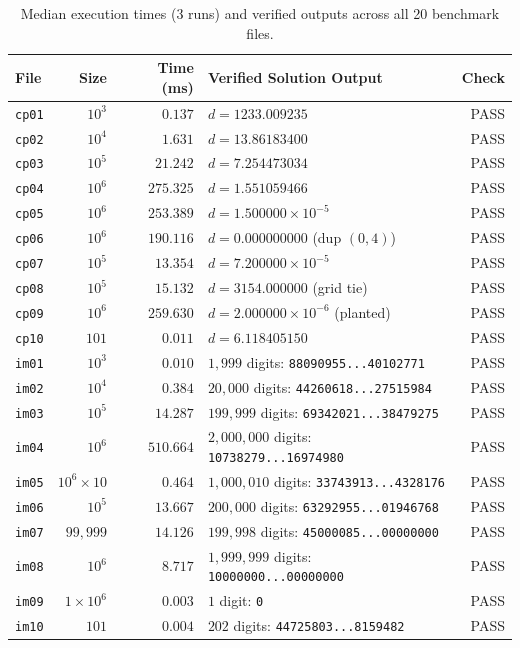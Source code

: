\documentclass[10pt,twocolumn]{article}
\begin{document}
\begin{table}[t]
\centering
\caption{Median execution times ($3$ runs) and verified outputs across all 20 benchmark files.}
\label{tab:results}
\scriptsize
\setlength{\tabcolsep}{2.8pt}
\begin{tabularx}{\columnwidth}{@{}lrrXr@{}}
\toprule
\textbf{File} & \textbf{Size} & \textbf{Time (ms)} & \textbf{Verified Solution Output} & \textbf{Check} \\
\midrule
\texttt{cp01} & $10^3$ & $0.137$ & $d = 1233.009235$ & PASS \\
\texttt{cp02} & $10^4$ & $1.631$ & $d = 13.86183400$ & PASS \\
\texttt{cp03} & $10^5$ & $21.242$ & $d = 7.254473034$ & PASS \\
\texttt{cp04} & $10^6$ & $275.325$ & $d = 1.551059466$ & PASS \\
\texttt{cp05} & $10^6$ & $253.389$ & $d = 1.500000 \times 10^{-5}$ & PASS \\
\texttt{cp06} & $10^6$ & $190.116$ & $d = 0.000000000$ (dup $(0,4)$) & PASS \\
\texttt{cp07} & $10^5$ & $13.354$ & $d = 7.200000 \times 10^{-5}$ & PASS \\
\texttt{cp08} & $10^5$ & $15.132$ & $d = 3154.000000$ (grid tie) & PASS \\
\texttt{cp09} & $10^6$ & $259.630$ & $d = 2.000000 \times 10^{-6}$ (planted) & PASS \\
\texttt{cp10} & $101$ & $0.011$ & $d = 6.118405150$ & PASS \\
\midrule
\texttt{im01} & $10^3$ & $0.010$ & $1{,}999$ digits: \texttt{88090955...40102771} & PASS \\
\texttt{im02} & $10^4$ & $0.384$ & $20{,}000$ digits: \texttt{44260618...27515984} & PASS \\
\texttt{im03} & $10^5$ & $14.287$ & $199{,}999$ digits: \texttt{69342021...38479275} & PASS \\
\texttt{im04} & $10^6$ & $510.664$ & $2{,}000{,}000$ digits: \texttt{10738279...16974980} & PASS \\
\texttt{im05} & $10^6{\times}10$ & $0.464$ & $1{,}000{,}010$ digits: \texttt{33743913...4328176} & PASS \\
\texttt{im06} & $10^5$ & $13.667$ & $200{,}000$ digits: \texttt{63292955...01946768} & PASS \\
\texttt{im07} & $99{,}999$ & $14.126$ & $199{,}998$ digits: \texttt{45000085...00000000} & PASS \\
\texttt{im08} & $10^6$ & $8.717$ & $1{,}999{,}999$ digits: \texttt{10000000...00000000} & PASS \\
\texttt{im09} & $1{\times}10^6$ & $0.003$ & $1$ digit: \texttt{0} & PASS \\
\texttt{im10} & $101$ & $0.004$ & $202$ digits: \texttt{44725803...8159482} & PASS \\
\bottomrule
\end{tabularx}
\vspace{-0.5em}
\end{table}
\end{document}
